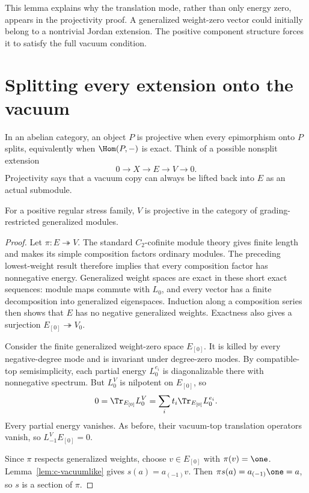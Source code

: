 This lemma explains why the translation mode, rather than only energy
zero, appears in the projectivity proof. A generalized weight-zero
vector could initially belong to a nontrivial Jordan extension. The
positive component structure forces it to satisfy the full vacuum
condition.

\section{Splitting every extension onto the vacuum}

In an abelian category, an object $P$ is projective when every
epimorphism onto $P$ splits, equivalently when $\Hom(P,-)$ is exact.
Think of a possible nonsplit extension
\[
 0\longrightarrow X\longrightarrow E\longrightarrow V
                                      \longrightarrow0.
\]
Projectivity says that a vacuum copy can always be lifted back into
$E$ as an actual submodule.

\begin{proposition}\label{prop:c-projective}
For a positive regular stress family, $V$ is projective in the
category of grading-restricted generalized modules.
\end{proposition}
\begin{proof}
Let $\pi:E\twoheadrightarrow V$. The standard $C_2$-cofinite module
theory gives finite length and makes its simple composition factors
ordinary modules. The preceding lowest-weight result therefore implies
that every composition factor has nonnegative energy. Generalized
weight spaces are exact in these short exact sequences: module maps
commute with $L_0$, and every vector has a finite decomposition into
generalized eigenspaces. Induction along a composition series then
shows that $E$ has no negative generalized weights. Exactness also
gives a surjection $E_{[0]}\twoheadrightarrow V_0$.

Consider the finite generalized weight-zero space $E_{[0]}$. It is
killed by every negative-degree mode and is invariant under
degree-zero modes. By compatible-top semisimplicity, each partial
energy $L^{e_i}_0$ is diagonalizable there with nonnegative spectrum.
But $L^V_0$ is nilpotent on $E_{[0]}$, so
\[
 0=\Tr_{E_{[0]}}L^V_0
       =\sum_i t_i\Tr_{E_{[0]}}L^{e_i}_0.
\]
Every partial energy vanishes. As before, their vacuum-top translation
operators vanish, so $L^V_{-1}E_{[0]}=0$.

Since $\pi$ respects generalized weights, choose $v\in E_{[0]}$
with $\pi(v)=\one$. Lemma~\ref{lem:c-vacuumlike} gives
$s(a)=a_{(-1)}v$. Then $\pi s(a)=a_{(-1)}\one=a$, so $s$ is a
section of $\pi$.
\end{proof}

